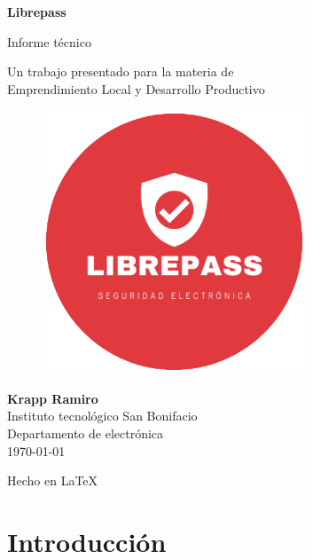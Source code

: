 \documentclass{article}
\begin{document}
\begin{titlepage}
	\begin{center}
		\vspace{1cm}

		{\Huge
			\textbf{Librepass}}

		\vspace{0.3cm}
		{\LARGE
			Informe técnico}

		\vspace{0.5cm}
		{\Large
			Un trabajo presentado para la materia de \\
			Emprendimiento Local y Desarrollo Productivo}

		\vspace{1cm}

		\begin{figure}[H]
			\centering
			\includegraphics[width=0.7\textwidth]{../../informe/images/logo.png}
		\end{figure}

		\vfill

		{\Large
			\textbf{Krapp Ramiro} \\
			\vspace{0.5cm}
			Instituto tecnológico San Bonifacio\\
			Departamento de electrónica\\
			\today
		}

		\vspace{0.5cm}
		{\large Hecho en {\LaTeX}}

	\end{center}
\end{titlepage}

\section{Introducción}
%
\end{document}
